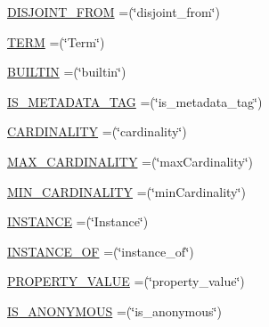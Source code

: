 \begin{DoxyCompactItemize}
\item 
\hyperlink{enumorg_1_1coode_1_1owlapi_1_1obo_1_1parser_1_1_o_b_o_vocabulary_ac5214c9b3957fa7d6d71650733664ecf}{D\-I\-S\-J\-O\-I\-N\-T\-\_\-\-F\-R\-O\-M} =(\char`\"{}disjoint\-\_\-from\char`\"{})
\item 
\hyperlink{enumorg_1_1coode_1_1owlapi_1_1obo_1_1parser_1_1_o_b_o_vocabulary_afbcc504b63fcef74b66c55b6ec7f0e63}{T\-E\-R\-M} =(\char`\"{}Term\char`\"{})
\item 
\hyperlink{enumorg_1_1coode_1_1owlapi_1_1obo_1_1parser_1_1_o_b_o_vocabulary_a3569c8134b14db1bcecf3d2b72cc8794}{B\-U\-I\-L\-T\-I\-N} =(\char`\"{}builtin\char`\"{})
\item 
\hyperlink{enumorg_1_1coode_1_1owlapi_1_1obo_1_1parser_1_1_o_b_o_vocabulary_a77b42262890e5bf6b77b4624c34c04fd}{I\-S\-\_\-\-M\-E\-T\-A\-D\-A\-T\-A\-\_\-\-T\-A\-G} =(\char`\"{}is\-\_\-metadata\-\_\-tag\char`\"{})
\item 
\hyperlink{enumorg_1_1coode_1_1owlapi_1_1obo_1_1parser_1_1_o_b_o_vocabulary_add10251097e82454ccc65c55172435da}{C\-A\-R\-D\-I\-N\-A\-L\-I\-T\-Y} =(\char`\"{}cardinality\char`\"{})
\item 
\hyperlink{enumorg_1_1coode_1_1owlapi_1_1obo_1_1parser_1_1_o_b_o_vocabulary_a9cd4bd371ef936e5c857f29454116466}{M\-A\-X\-\_\-\-C\-A\-R\-D\-I\-N\-A\-L\-I\-T\-Y} =(\char`\"{}max\-Cardinality\char`\"{})
\item 
\hyperlink{enumorg_1_1coode_1_1owlapi_1_1obo_1_1parser_1_1_o_b_o_vocabulary_a3d440747db226ab0b966a0907be942d1}{M\-I\-N\-\_\-\-C\-A\-R\-D\-I\-N\-A\-L\-I\-T\-Y} =(\char`\"{}min\-Cardinality\char`\"{})
\item 
\hyperlink{enumorg_1_1coode_1_1owlapi_1_1obo_1_1parser_1_1_o_b_o_vocabulary_a8908f1023190de1c51ddd00b5eef5480}{I\-N\-S\-T\-A\-N\-C\-E} =(\char`\"{}Instance\char`\"{})
\item 
\hyperlink{enumorg_1_1coode_1_1owlapi_1_1obo_1_1parser_1_1_o_b_o_vocabulary_a0d72c237fc8915205014337046df934e}{I\-N\-S\-T\-A\-N\-C\-E\-\_\-\-O\-F} =(\char`\"{}instance\-\_\-of\char`\"{})
\item 
\hyperlink{enumorg_1_1coode_1_1owlapi_1_1obo_1_1parser_1_1_o_b_o_vocabulary_a125c090e27929d8d62d70139729da1ee}{P\-R\-O\-P\-E\-R\-T\-Y\-\_\-\-V\-A\-L\-U\-E} =(\char`\"{}property\-\_\-value\char`\"{})
\item 
\hyperlink{enumorg_1_1coode_1_1owlapi_1_1obo_1_1parser_1_1_o_b_o_vocabulary_a288da6a5b23c8c4f43c6dbb77293cd17}{I\-S\-\_\-\-A\-N\-O\-N\-Y\-M\-O\-U\-S} =(\char`\"{}is\-\_\-anonymous\char`\"{})
\end{DoxyCompactItemize}
